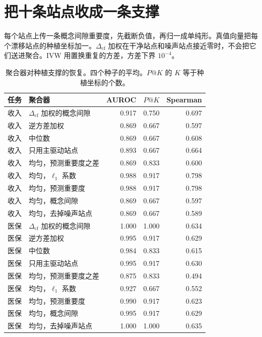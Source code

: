 \documentclass[11pt,a4paper,fontset=none]{ctexart}
\newcommand{\Dcf}{\ensuremath{\Delta_{\mathrm{cf}}}}
\begin{document}
\section{把十条站点收成一条支撑}

每个站点上传一条概念间隙重要度，先截断负值，再归一成单纯形。真值向量把每个漂移站点的种植坐标加一。\(\Dcf\) 加权在干净站点和噪声站点接近零时，不会把它们送进聚合。IVW 用置换重复的方差，方差下界 \(10^{-4}\)。

\begin{table}[ht]
\centering
\caption{聚合器对种植支撑的恢复。四个种子的平均。\(P@K\) 的 \(K\) 等于种植坐标的个数。}
\label{tab:agg}
\small
\begin{tabular}{@{}llrrr@{}}
\toprule
任务 & 聚合器 & AUROC & \(P@K\) & Spearman \\
\midrule
收入 & \(\Dcf\) 加权的概念间隙 & 0.917 & 0.750 & 0.697 \\
收入 & 逆方差加权 & 0.869 & 0.667 & 0.597 \\
收入 & 中位数 & 0.869 & 0.667 & 0.608 \\
收入 & 只用主驱动站点 & 0.893 & 0.667 & 0.664 \\
收入 & 均匀，预测重要度之差 & 0.869 & 0.833 & 0.600 \\
收入 & 均匀，\(\ell_1\) 系数 & 0.988 & 0.917 & 0.798 \\
收入 & 均匀，预测重要度 & 0.988 & 0.917 & 0.798 \\
收入 & 均匀，概念间隙 & 0.869 & 0.667 & 0.597 \\
收入 & 均匀，去掉噪声站点 & 0.869 & 0.667 & 0.589 \\
医保 & \(\Dcf\) 加权的概念间隙 & 1.000 & 1.000 & 0.634 \\
医保 & 逆方差加权 & 0.995 & 0.917 & 0.629 \\
医保 & 中位数 & 0.984 & 0.833 & 0.615 \\
医保 & 只用主驱动站点 & 0.995 & 0.917 & 0.630 \\
医保 & 均匀，预测重要度之差 & 0.875 & 0.833 & 0.494 \\
医保 & 均匀，\(\ell_1\) 系数 & 0.927 & 0.667 & 0.552 \\
医保 & 均匀，预测重要度 & 0.990 & 0.917 & 0.623 \\
医保 & 均匀，概念间隙 & 0.995 & 0.917 & 0.629 \\
医保 & 均匀，去掉噪声站点 & 1.000 & 1.000 & 0.635 \\
\bottomrule
\end{tabular}
\end{table}
\end{document}

